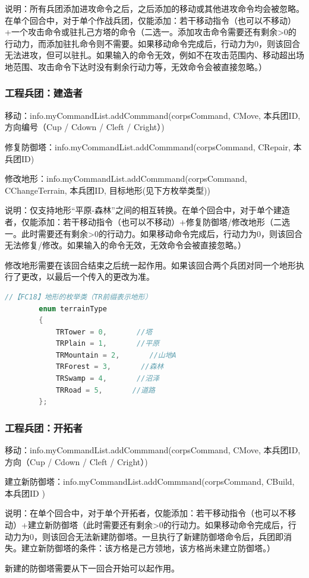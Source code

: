 \documentclass[a4paper,4pt]{article}
\begin{document}
说明：所有兵团添加进攻命令之后，之后添加的移动或其他进攻命令均会被忽略。在单个回合中，对于单个作战兵团，仅能添加：若干移动指令（也可以不移动）+一个攻击命令或驻扎己方塔的命令（二选一。添加攻击命令需要还有剩余>0的行动力，而添加驻扎命令则不需要。如果移动命令完成后，行动力为0，则该回合无法进攻，但可以驻扎。如果输入的命令无效，例如不在攻击范围内、移动超出场地范围、攻击命令下达时没有剩余行动力等，无效命令会被直接忽略。）

\subsubsection{工程兵团：建造者}
移动：info.myCommandList.addCommmand(corpsCommand, {CMove, 本兵团ID, 方向编号（Cup / Cdown / Cleft / Cright）})\par
修复防御塔：info.myCommandList.addCommmand(corpsCommand, {CRepair, 本兵团ID})\par
修改地形：info.myCommandList.addCommmand(corpsCommand, {CChangeTerrain, 本兵团ID, 目标地形(见下方枚举类型)})\par
说明：仅支持地形“平原-森林”之间的相互转换。在单个回合中，对于单个建造者，仅能添加：若干移动指令（也可以不移动）+修复防御塔/修改地形（二选一。此时需要还有剩余>0的行动力。如果移动命令完成后，行动力为0，则该回合无法修复/修改。如果输入的命令无效，无效命令会被直接忽略。）\par
修改地形需要在该回合结束之后统一起作用。如果该回合两个兵团对同一个地形执行了更改，以最后一个传入的更改为准。
\begin{lstlisting}[language={C++},title={生产任务类型}]  %插入代码块
		//【FC18】地形的枚举类（TR前缀表示地形）
		enum terrainType
		{
			TRTower = 0,       //塔
			TRPlain = 1,       //平原
			TRMountain = 2,       //山地A
			TRForest = 3,       //森林
			TRSwamp = 4,       //沼泽
			TRRoad = 5,       //道路
		};
\end{lstlisting}
\subsubsection{工程兵团：开拓者}
移动：info.myCommandList.addCommmand(corpsCommand, {CMove, 本兵团ID, 方向（Cup / Cdown / Cleft / Cright）})\par
建立新防御塔：info.myCommandList.addCommmand(corpsCommand, { CBuild, 本兵团ID })\par
说明：在单个回合中，对于单个开拓者，仅能添加：若干移动指令（也可以不移动）+建立新防御塔（此时需要还有剩余>0的行动力。如果移动命令完成后，行动力为0，则该回合无法新建防御塔。一旦执行了新建防御塔命令后，兵团即消失。建立新防御塔的条件：该方格是己方领地，该方格尚未建立防御塔。）\par
新建的防御塔需要从下一回合开始可以起作用。
\end{document}
